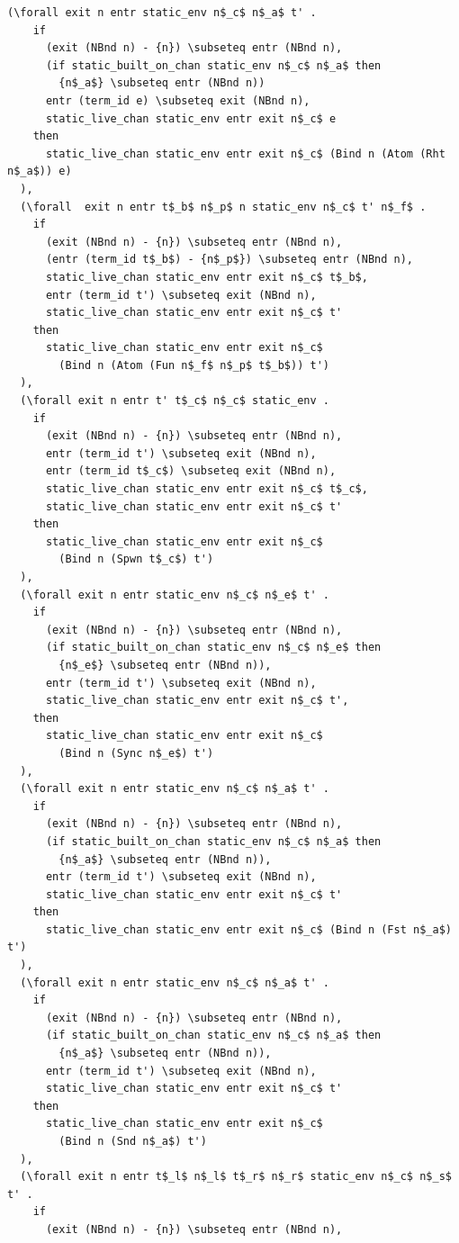 \documentclass[10pt]{article}
\begin{document}
\begin{lstlisting}[language=logic, mathescape]
  (\forall exit n entr static_env n$_c$ n$_a$ t' . 
    if
      (exit (NBnd n) - {n}) \subseteq entr (NBnd n),
      (if static_built_on_chan static_env n$_c$ n$_a$ then
        {n$_a$} \subseteq entr (NBnd n))
      entr (term_id e) \subseteq exit (NBnd n),
      static_live_chan static_env entr exit n$_c$ e
    then
      static_live_chan static_env entr exit n$_c$ (Bind n (Atom (Rht n$_a$)) e)
  ),
  (\forall  exit n entr t$_b$ n$_p$ n static_env n$_c$ t' n$_f$ . 
    if
      (exit (NBnd n) - {n}) \subseteq entr (NBnd n),
      (entr (term_id t$_b$) - {n$_p$}) \subseteq entr (NBnd n),
      static_live_chan static_env entr exit n$_c$ t$_b$,
      entr (term_id t') \subseteq exit (NBnd n),
      static_live_chan static_env entr exit n$_c$ t'
    then
      static_live_chan static_env entr exit n$_c$
        (Bind n (Atom (Fun n$_f$ n$_p$ t$_b$)) t')
  ),
  (\forall exit n entr t' t$_c$ n$_c$ static_env .
    if
      (exit (NBnd n) - {n}) \subseteq entr (NBnd n),
      entr (term_id t') \subseteq exit (NBnd n),
      entr (term_id t$_c$) \subseteq exit (NBnd n),
      static_live_chan static_env entr exit n$_c$ t$_c$,
      static_live_chan static_env entr exit n$_c$ t'
    then
      static_live_chan static_env entr exit n$_c$
        (Bind n (Spwn t$_c$) t')
  ),
  (\forall exit n entr static_env n$_c$ n$_e$ t' .
    if
      (exit (NBnd n) - {n}) \subseteq entr (NBnd n),
      (if static_built_on_chan static_env n$_c$ n$_e$ then
        {n$_e$} \subseteq entr (NBnd n)),
      entr (term_id t') \subseteq exit (NBnd n),
      static_live_chan static_env entr exit n$_c$ t',
    then
      static_live_chan static_env entr exit n$_c$
        (Bind n (Sync n$_e$) t')
  ),
  (\forall exit n entr static_env n$_c$ n$_a$ t' .
    if
      (exit (NBnd n) - {n}) \subseteq entr (NBnd n),
      (if static_built_on_chan static_env n$_c$ n$_a$ then
        {n$_a$} \subseteq entr (NBnd n)),
      entr (term_id t') \subseteq exit (NBnd n),
      static_live_chan static_env entr exit n$_c$ t'
    then
      static_live_chan static_env entr exit n$_c$ (Bind n (Fst n$_a$) t')
  ),
  (\forall exit n entr static_env n$_c$ n$_a$ t' .
    if 
      (exit (NBnd n) - {n}) \subseteq entr (NBnd n),
      (if static_built_on_chan static_env n$_c$ n$_a$ then
        {n$_a$} \subseteq entr (NBnd n)),
      entr (term_id t') \subseteq exit (NBnd n),
      static_live_chan static_env entr exit n$_c$ t'
    then
      static_live_chan static_env entr exit n$_c$
        (Bind n (Snd n$_a$) t')
  ),
  (\forall exit n entr t$_l$ n$_l$ t$_r$ n$_r$ static_env n$_c$ n$_s$ t' .
    if 
      (exit (NBnd n) - {n}) \subseteq entr (NBnd n),

\end{lstlisting}
\end{document}

